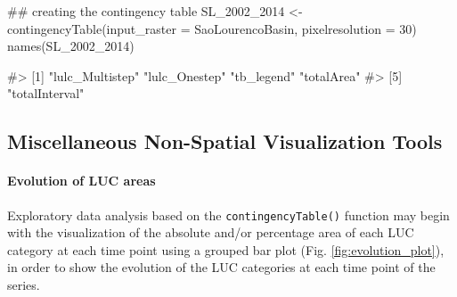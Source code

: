 \begin{Schunk}
\begin{Sinput}
## creating the contingency table
SL_2002_2014 <- contingencyTable(input_raster = SaoLourencoBasin,
                                 pixelresolution = 30)
names(SL_2002_2014)
\end{Sinput}
\begin{Soutput}
#> [1] "lulc_Multistep" "lulc_Onestep"   "tb_legend"      "totalArea"     
#> [5] "totalInterval"
\end{Soutput}
\end{Schunk}

\FloatBarrier

\hypertarget{miscellaneous-non-spatial-visualization-tools}{%
\subsection{Miscellaneous Non-Spatial Visualization
Tools}\label{miscellaneous-non-spatial-visualization-tools}}

\hypertarget{evolution-of-luc-areas}{%
\paragraph{Evolution of LUC areas}\label{evolution-of-luc-areas}}

Exploratory data analysis based on the \texttt{contingencyTable()}
function may begin with the visualization of the absolute and/or
percentage area of each LUC category at each time point using a grouped
bar plot (Fig. \ref{fig:evolution_plot}), in order to show the evolution
of the LUC categories at each time point of the series.

